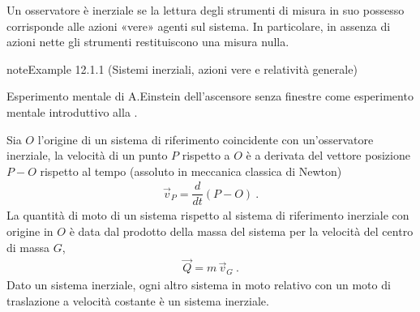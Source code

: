 \documentclass[letterpaper,10pt,italian]{jupyterBook}
\begin{document}
\sphinxAtStartPar
{}
Un osservatore è inerziale se la lettura degli strumenti di misura in suo possesso corrisponde alle azioni «vere» agenti sul sistema. In particolare, in assenza di azioni nette gli strumenti restituiscono una misura nulla.
\label{ch/mechanics/dynamics-principles:example-0}
\begin{sphinxadmonition}{note}{Example 12.1.1 (Sistemi inerziali, azioni vere e relatività generale)}



\sphinxAtStartPar
Esperimento mentale di A.Einstein dell’ascensore senza finestre come esperimento mentale introduttivo alla .
\end{sphinxadmonition}

\sphinxAtStartPar
{}
Sia \(O\) l’origine di un sistema di riferimento coincidente con un’osservatore inerziale, la velocità di un punto \(P\) rispetto a \(O\) è a derivata del vettore posizione \(P - O\) rispetto al tempo (assoluto in meccanica classica di Newton)
\begin{equation*}
\begin{split}\vec{v}_P = \dfrac{d}{dt} (P - O) \ .\end{split}
\end{equation*}
\sphinxAtStartPar
La quantità di moto di un sistema rispetto al sistema di riferimento inerziale con origine in \(O\) è data dal prodotto della massa del sistema per la velocità del centro di massa \(G\),
\begin{equation*}
\begin{split}\vec{Q} = m \, \vec{v}_G \ .\end{split}
\end{equation*}
\sphinxAtStartPar
{}
Dato un sistema inerziale, ogni altro sistema in moto relativo con un moto di traslazione a velocità costante è un sistema inerziale.

\sphinxAtStartPar
{} 
\end{document}
